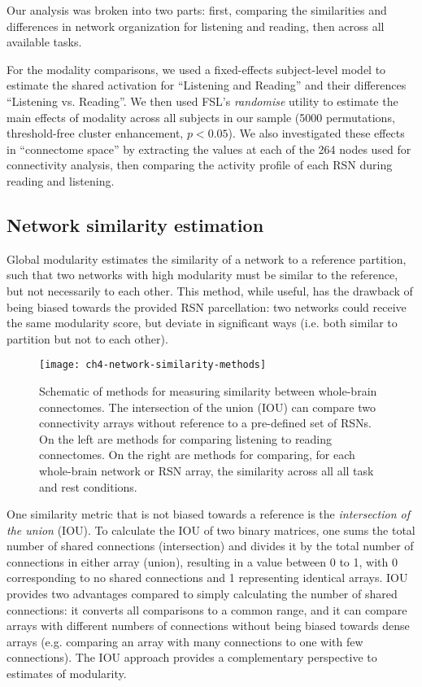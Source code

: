 Our analysis was broken into two parts: first, comparing the similarities and differences in network organization for listening and reading, then across all available tasks. 

For the modality comparisons, we used a fixed-effects subject-level model to estimate the shared activation for ``Listening and Reading'' and their differences ``Listening vs. Reading''. We then used FSL's \textit{randomise} utility to estimate the main effects of modality across all subjects in our sample (5000 permutations, threshold-free cluster enhancement, $p < 0.05$).  We also investigated these effects in ``connectome space'' by extracting the values at each of the 264 nodes used for connectivity analysis, then comparing the activity profile of each RSN during reading and listening.

\subsection{Network similarity estimation}

Global modularity estimates the similarity of a network to a reference partition, such that two networks with high modularity must be similar to the reference, but not necessarily to each other. This method, while useful, has the drawback of being biased towards the provided RSN parcellation: two networks could receive the same modularity score, but deviate in significant ways (i.e. both similar to partition but not to each other). 

\begin{figure}[t]
	\centering
	\texttt{[image: ch4-network-similarity-methods]}
    \caption[Methods for measuring similarity between whole-brain connectomes]{Schematic of methods for measuring similarity between whole-brain connectomes. The intersection of the union (IOU) can compare two connectivity arrays without reference to a pre-defined set of RSNs. On the left are methods for comparing listening to reading connectomes. On the right are methods for comparing, for each whole-brain network or RSN array, the similarity across all all task and rest conditions.}
	\label{fig:ch4-network-similarity-methods}
\end{figure}

One similarity metric that is not biased towards a reference is the \textit{intersection of the union} (IOU). To calculate the IOU of two binary matrices, one sums the total number of shared connections (intersection) and divides it by the total number of connections in either array (union), resulting in a value between 0 to 1, with 0 corresponding to no shared connections and 1 representing identical arrays. IOU provides two advantages compared to simply calculating the number of shared connections: it converts all comparisons to a common range, and it can compare arrays with different numbers of connections without being biased towards dense arrays (e.g. comparing an array with many connections to one with few connections). The IOU approach provides a complementary perspective to estimates of modularity.

